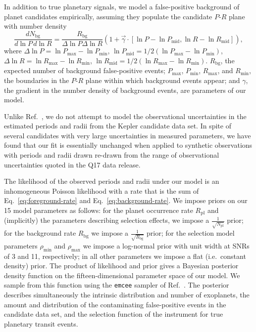 \documentclass{nature}
\newcommand{\Rpl}{R_\mathrm{pl}}
\newcommand{\Npl}{N_\mathrm{pl}}
\newcommand{\Rbg}{R_\mathrm{bg}}
\newcommand{\Nbg}{N_\mathrm{bg}}
\newcommand{\rhomin}{\rho_\mathrm{min}}
\newcommand{\rhomax}{\rho_\mathrm{max}}
\begin{document}
In addition to true planetary signals, we model a false-positive
background of planet candidates empirically, assuming they populate
the candidate $P$-$R$ plane with number density
\begin{equation}
  \label{eq:background-rate}
  \frac{d\Nbg}{d \ln P \, d \ln R} = \frac{\Rbg}{\Delta \ln P \Delta
    \ln R} \left( 1 + \vec{\gamma} \cdot \left[ \ln P - \ln P_\mathrm{mid} , \ln
    R - \ln R_\mathrm{mid} \right] \right),
\end{equation}
where $\Delta \ln P = \ln P_\mathrm{max} - \ln P_\mathrm{min}$, $\ln
P_\mathrm{mid} = 1/2\left(\ln P_\mathrm{max} - \ln P_\mathrm{min}
\right)$, $\Delta \ln R = \ln R_\mathrm{max} - \ln R_\mathrm{min}$,
$\ln R_\mathrm{mid} = 1/2\left(\ln R_\mathrm{max} - \ln R_\mathrm{min}
\right)$.  $\Rbg$, the expected number of background false-positive
events; $P_\mathrm{max}$, $P_\mathrm{min}$, $R_\mathrm{max}$, and
$R_\mathrm{min}$, the boundaries in the $P$-$R$ plane within which
background events appear; and $\gamma$, the gradient in the number
density of background events, are parameters of our model.

Unlike Ref.\ \cite{Foreman-Mackey2014}, we do not attempt to model the
observational uncertainties in the estimated periods and radii from
the Kepler candidate data set.  In spite of several candidates with
very large uncertainties in measured parameters, we have found that our
fit is essentially unchanged when applied to synthetic observations
with periods and radii drawn re-drawn from the range of observational
uncertainties quoted in the Q17 data release.  

The likelihood of the observed periods and radii under our model is an
inhomogeneous Poisson likelihood\cite{Farr2013,Youdin2011} with a rate
that is the sum of Eq.\ \eqref{eq:foreground-rate} and
Eq.\ \eqref{eq:background-rate}.  We impose priors on our 15 model
parameters as follows: for the planet occurrence rate $\Rpl$ and
(implicitly) the parameters describing selection effects, we impose a
$\frac{1}{\sqrt{\Npl}}$ prior; for the background rate $\Rbg$ we
impose a $\frac{1}{\sqrt{\Rbg}}$ prior; for the selection model
parameters $\rhomin$ and $\rhomax$ we impose a log-normal prior with
unit width at SNRs of 3 and 11, respectively; in all other parameters
we impose a flat (i.e.\ constant density) prior.  The product of
likelihood and prior gives a Bayesian posterior density function on
the fifteen-dimensional parameter space of our model.  We sample from
this function using the \texttt{emcee} sampler of
Ref.\ \cite{Foreman-Mackey2013}.  The posterior describes
simultaneously the intrinsic distribution and number of exoplanets,
the amount and distribution of the contaminating false-positive events
in the candidate data set, and the selection function of the
instrument for true planetary transit events.
\end{document}
